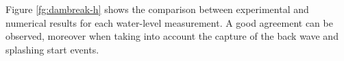 Figure \ref{fg:dambreak-h} shows the comparison between experimental and numerical results for each water-level measurement. A good agreement can be observed, moreover when taking into account the capture of the back wave and splashing start events.
  \begin{figure}[h]
  \centering
     \\
\end{figure}
